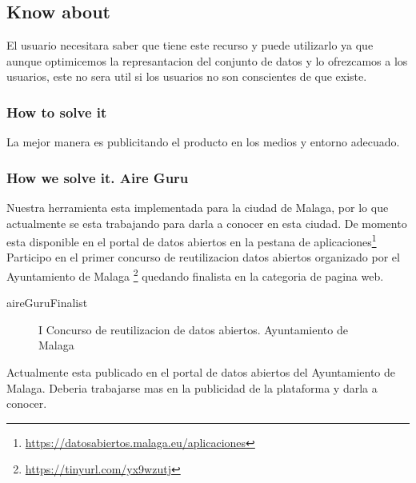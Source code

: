 \subsection{Know about}

El usuario necesitara saber que tiene este recurso y puede utilizarlo ya que aunque optimicemos la represantacion del 
conjunto de datos y lo ofrezcamos a los usuarios, este no sera util si los usuarios no son conscientes de que existe.
\subsubsection{How to solve it} 
La mejor manera es publicitando el producto en los medios y entorno adecuado.
\subsubsection{How we solve it. Aire Guru} 
Nuestra herramienta esta implementada para la ciudad de Malaga, por lo que actualmente se esta trabajando para darla a 
conocer en esta ciudad.
De momento esta disponible en el portal de datos abiertos en la pestana de aplicaciones\footnote{\url{https://datosabiertos.malaga.eu/aplicaciones}}\\
Participo en el primer concurso de reutilizacion datos abiertos organizado por el Ayuntamiento de Malaga \footnote{\url{https://tinyurl.com/yx9wzutj}}
quedando finalista en la categoria de pagina web.

aireGuruFinalist

\begin{figure}[ht]
    \centering
   \hfill
 
    \caption{I Concurso de reutilizacion de datos abiertos. Ayuntamiento de Malaga}
    \end{figure}

\begin{itemize}
\done Actualmente esta publicado en el portal de datos abiertos del Ayuntamiento de Malaga.
\crossed Deberia trabajarse mas en la publicidad de la plataforma y darla a conocer.  
\end{itemize}
\newpage